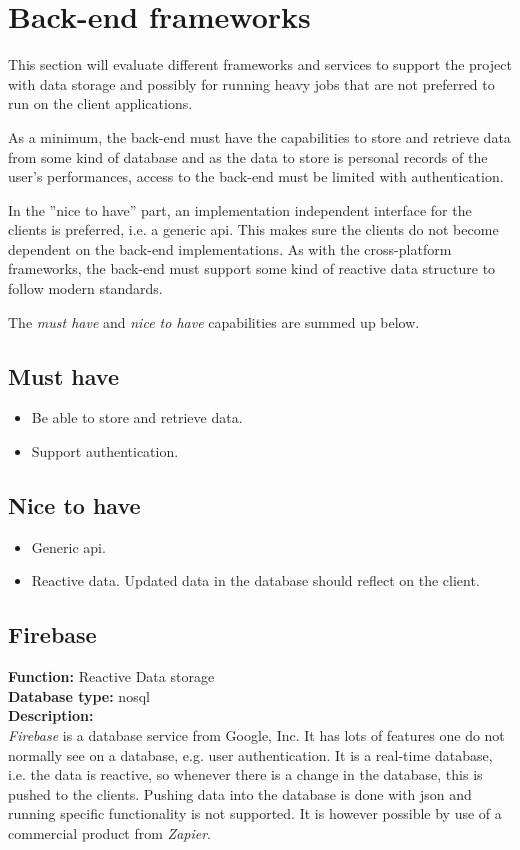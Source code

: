 \section{Back-end frameworks}
This section will evaluate different frameworks and services to support the project with data storage and possibly for running heavy jobs that are not preferred to run on the client applications.

As a minimum, the back-end must have the capabilities to store and retrieve data from some kind of database and as the data to store is personal records of the user's performances, access to the back-end must be limited with authentication.

In the ''nice to have'' part, an implementation independent interface for the clients is preferred, i.e. a generic \gls{api}.
This makes sure the clients do not become dependent on the back-end implementations.
As with the cross-platform frameworks, the back-end must support some kind of reactive data structure to follow modern standards.

The \textit{must have} and \textit{nice to have} capabilities are summed up below.
	
\subsection*{Must have}
\begin{itemize}
	\item Be able to store and retrieve data.
	\item Support authentication.
\end{itemize}
	
\subsection*{Nice to have}	
\begin{itemize}
	\item Generic \gls{api}.
	\item Reactive data. Updated data in the database should reflect on the client.
\end{itemize}

\subsection*{Firebase}
\textbf{Function:} Reactive Data storage
\\
\textbf{Database type:} \gls{nosql}
\\
\textbf{Description:}
\\
\textit{Firebase} is a database service from Google, Inc. 
It has lots of features one do not normally see on a database, e.g. user authentication.
It is a real-time database, i.e. the data is reactive, so whenever there is a change in the database, this is pushed to the clients. 
Pushing data into the database is done with \gls{json} and running specific functionality is not supported.
It is however possible by use of a commercial product from  \textit{Zapier}.

